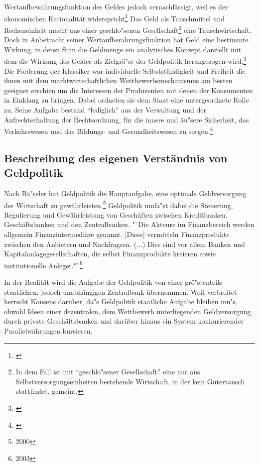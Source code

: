 \documentclass[
        onecolumn,
        a4paper,
        abstracton,
        parskip=half
        ,final
        ]{scrartcl}
\begin{document}
Wertaufbewahrungsfunktion des Geldes jedoch vernachl{\"a}ssigt, weil es der {\"o}konomischen Rationalit{\"a}t widerspricht\footnote[17]{\citep*[S.53]{bombach1981theorie}} Das Geld als Tauschmittel und Recheneinheit macht aus einer geschlo{"s}enen Gesellschaft\footnote[18]{In dem Fall ist mit "`geschlo{"s}ener Gesellschaft"' eine nur aus Selbstversorgungseinheiten bestehende Wirtschaft, in der kein G{\"u}tertausch stattfindet, gemeint.} eine Tauschwirtschaft. Doch in Anbetracht seiner Wertaufberahrungsfunktion hat Geld eine bestimmte Wirkung, in deren Sinn die Geldmenge ein analytisches Konzept darstellt mit dem die Wirkung des Geldes als Zielgr{\"o}{"s}e der Geldpolitik herangezogen wird.\footnote[19]{\citep*[S.421]{Basseler2010}} Die Forderung der Klassiker war individuelle Selbstst{\"a}ndigkeit und Freiheit die ihnen mit dem marktwirtschaftlichen Wettbewerbsmechanismus am besten geeignet erschien um die Interessen der Produzenten mit denen der Konsumenten in Einklang zu bringen. Dabei ordneten sie dem Staat eine untergeordnete Rolle zu. Seine Aufgabe bestand "`lediglich"' aus der Verwaltung und der Aufrechterhaltung der Rechtsordnung, f{\"u}r die innere und {\"a}u{"s}ere Sicherheit, das Verkehrswesen und das Bildungs- und Gesundheitswesen zu sorgen.\footnote[20]{\citep*[S.60f]{Basseler2010}}


\subsection{Beschreibung des eigenen Verst{\"a}ndnis von Geldpolitik}

Nach Ba{"s}eler hat Geldpolitik die Hauptaufgabe, eine optimale Geldversorgung der Wirtschaft zu gew{\"a}hrleisten.\footnote{2000}{\citep*[vgl.][S. 551]{Basseler2010}}
Geldpolitik umfa{"s}t dabei die Steuerung, Regulierung und Gew{\"a}hrleistung von Gesch{\"a}ften zwischen Kreditbanken, Gesch{\"a}ftsbanken und den Zentralbanken.
 "`Die Akteure im Finanzbereich werden allgemein Finanzintermedi{\"a}re genannt. [Diese] vermitteln Finanzprodukte zwischen den Anbietern und Nachfragern. (...) Dies sind vor allem Banken und Kapitalanlagegesellschaften, die selbst Finanzprodukte kreieren sowie institutionelle Anleger."`\footnote{2003}{\citep*[vgl.][S.511f]{Basseler2010}}

In der Realit{\"a}t wird die Aufgabe der Geldpolitik von einer gr{\"o}{"s}tenteils staatlichen, jedoch unabh{\"a}ngigen Zentralbank {\"u}bernommen. Weit verbreitet herrscht Konsens dar{\"u}ber, da{"s} Geldpolitik staatliche Aufgabe bleiben mu{"s}, obwohl Ideen einer dezentralen, dem Wettbewerb unterliegenden Geldversorgung durch private Gesch{\"a}ftsbanken und dar{\"u}ber hinaus ein System konkurierender Parallelw{\"a}hrungen kursieren.
\end{document}
